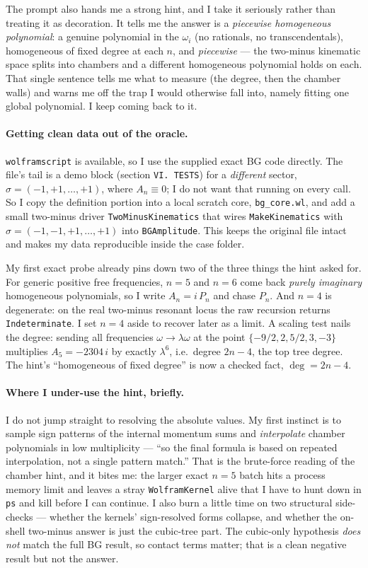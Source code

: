 \documentclass{article}
\begin{document}
The prompt also hands me a strong hint, and I take it seriously rather than
treating it as decoration. It tells me the answer is a \emph{piecewise
homogeneous polynomial}: a genuine polynomial in the $\omega_i$ (no rationals, no
transcendentals), homogeneous of fixed degree at each $n$, and \emph{piecewise}
--- the two-minus kinematic space splits into chambers and a different
homogeneous polynomial holds on each. That single sentence tells me what to
measure (the degree, then the chamber walls) and warns me off the trap I would
otherwise fall into, namely fitting one global polynomial. I keep coming back to
it.

\paragraph{Getting clean data out of the oracle.}
\texttt{wolframscript} is available, so I use the supplied exact BG code
directly. The file's tail is a demo block (section \texttt{VI.\ TESTS}) for a
\emph{different} sector, $\sigma=(-1,+1,\dots,+1)$, where $A_n\equiv0$; I do not
want that running on every call. So I copy the definition portion into a local
scratch core, \texttt{bg\_core.wl}, and add a small two-minus driver
\texttt{TwoMinusKinematics} that wires \texttt{MakeKinematics} with
$\sigma=(-1,-1,+1,\dots,+1)$ into \texttt{BGAmplitude}. This keeps the original
file intact and makes my data reproducible inside the case folder.

My first exact probe already pins down two of the three things the hint asked
for. For generic positive free frequencies, $n=5$ and $n=6$ come back
\emph{purely imaginary} homogeneous polynomials, so I write $A_n=i\,P_n$ and chase
$P_n$. And $n=4$ is degenerate: on the real two-minus resonant locus the raw
recursion returns \texttt{Indeterminate}. I set $n=4$ aside to recover later as a
limit. A scaling test nails the degree: sending all frequencies
$\omega\to\lambda\omega$ at the point $\{-9/2,2,5/2,3,-3\}$ multiplies
$A_5=-2304\,i$ by exactly $\lambda^6$, i.e.\ degree $2n-4$, the top tree degree.
The hint's ``homogeneous of fixed degree'' is now a checked fact, $\deg=2n-4$.

\paragraph{Where I under-use the hint, briefly.}
I do not jump straight to resolving the absolute values. My first instinct is to
sample sign patterns of the internal momentum sums and \emph{interpolate} chamber
polynomials in low multiplicity --- ``so the final formula is based on repeated
interpolation, not a single pattern match.'' That is the brute-force reading of
the chamber hint, and it bites me: the larger exact $n=5$ batch hits a process
memory limit and leaves a stray \texttt{WolframKernel} alive that I have to hunt
down in \texttt{ps} and kill before I can continue. I also burn a little time on
two structural side-checks --- whether the kernels' sign-resolved forms collapse,
and whether the on-shell two-minus answer is just the cubic-tree part. The
cubic-only hypothesis \emph{does not} match the full BG result, so contact terms
matter; that is a clean negative result but not the answer.
\end{document}
